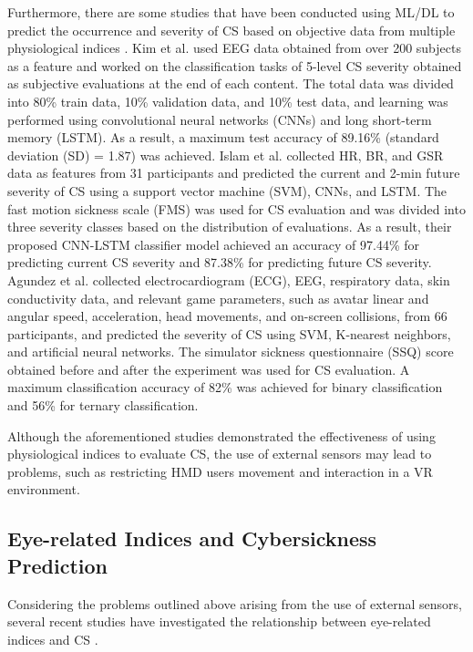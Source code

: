 \documentclass{ieeeaccess}
\begin{document}
Furthermore, there are some studies that have been conducted using ML/DL to predict the occurrence and severity of CS based on objective data from multiple physiological indices \cite{Kim_2019, Islam_2_2020, Agundez_2019, Kundu_2022, Jin_2018, Islam_2022, Anwar_2020}.
Kim et al. \cite{Kim_2019} used EEG data obtained from over 200 subjects as a feature and worked on the classification tasks of 5-level CS severity obtained as subjective evaluations at the end of each content. The total data was divided into 80\% train data, 10\% validation data, and 10\% test data, and learning was performed using convolutional neural networks (CNNs) and long short-term memory (LSTM). As a result, a maximum test accuracy of 89.16\% (standard deviation (SD) = 1.87) was achieved. Islam et al. \cite{Islam_2_2020} collected HR, BR, and GSR data as features from 31 participants and predicted the current and 2-min future severity of CS using a support vector machine (SVM), CNNs, and LSTM. The fast motion sickness scale (FMS) \cite{Keshavarz_2011} was used for CS evaluation and was divided into three severity classes based on the distribution of evaluations. As a result, their proposed CNN-LSTM classifier model achieved an accuracy of 97.44\% for predicting current CS severity and 87.38\% for predicting future CS severity. Agundez et al. \cite{Agundez_2019} collected electrocardiogram (ECG), EEG, respiratory data, skin conductivity data, and relevant game parameters, such as avatar linear and angular speed, acceleration, head movements, and on-screen collisions, from 66 participants, and predicted the severity of CS using SVM, K-nearest neighbors, and artificial neural networks. The simulator sickness questionnaire (SSQ) \cite{Kennedy_1993} score obtained before and after the experiment was used for CS evaluation. A maximum classification accuracy of 82\% was achieved for binary classification and 56\% for ternary classification.

Although the aforementioned studies demonstrated the effectiveness of using physiological indices to evaluate CS, the use of external sensors may lead to problems, such as restricting HMD users movement and interaction in a VR environment.

\subsection{Eye-related Indices and Cybersickness Prediction}
Considering the problems outlined above arising from the use of external sensors, several recent studies have investigated the relationship between eye-related indices and CS \cite{Lopes_2020, Chang_2021, Nam_2022}. 
\end{document}
